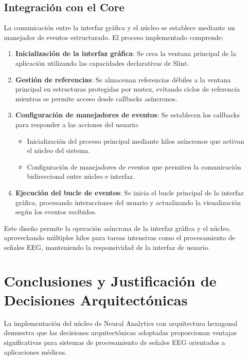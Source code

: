 \subsection{Integración con el Core}

La comunicación entre la interfaz gráfica y el núcleo se establece mediante un manejador de eventos estructurado. El proceso implementado comprende:

\begin{enumerate}
    \item \textbf{Inicialización de la interfaz gráfica}: Se crea la ventana principal de la aplicación utilizando las capacidades declarativas de Slint.
    
    \item \textbf{Gestión de referencias}: Se almacenan referencias débiles a la ventana principal en estructuras protegidas por mutex, evitando ciclos de referencia mientras se permite acceso desde callbacks asíncronos.
    
    \item \textbf{Configuración de manejadores de eventos}: Se establecen los callbacks para responder a las acciones del usuario:
    \begin{itemize}
        \item Inicialización del proceso principal mediante hilos asíncronos que activan el núcleo del sistema.
        \item Configuración de manejadores de eventos que permiten la comunicación bidireccional entre núcleo e interfaz.
    \end{itemize}
    
    \item \textbf{Ejecución del bucle de eventos}: Se inicia el bucle principal de la interfaz gráfica, procesando interacciones del usuario y actualizando la visualización según los eventos recibidos.
\end{enumerate}

Este diseño permite la operación asíncrona de la interfaz gráfica y el núcleo, aprovechando múltiples hilos para tareas intensivas como el procesamiento de señales EEG, manteniendo la responsividad de la interfaz de usuario.

\newpage
\section{Conclusiones y Justificación de Decisiones Arquitectónicas}

La implementación del núcleo de Neural Analytics con arquitectura hexagonal demuestra que las decisiones arquitectónicas adoptadas proporcionan ventajas significativas para sistemas de procesamiento de señales EEG orientados a aplicaciones médicas.

